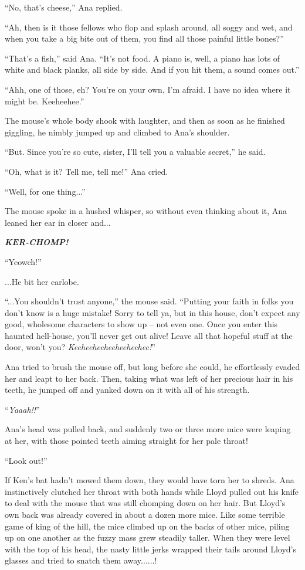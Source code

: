 \documentclass[
]{article}
\begin{document}
``No, that's cheese,'' Ana replied.

``Ah, then is it those fellows who flop and splash around, all soggy and
wet, and when you take a big bite out of them, you find all those
painful little bones?''

``That's a fish,'' said Ana. ``It's not food. A piano is, well, a piano
has lots of white and black planks, all side by side. And if you hit
them, a sound comes out.''

``Ahh, one of those, eh? You're on your own, I'm afraid. I have no idea
where it might be. Keeheehee.''

The mouse's whole body shook with laughter, and then as soon as he
finished giggling, he nimbly jumped up and climbed to Ana's shoulder.

``But. Since you're so cute, sister, I'll tell you a valuable secret,''
he said.

``Oh, what is it? Tell me, tell me!'' Ana cried.

``Well, for one thing...''

The mouse spoke in a hushed whisper, so without even thinking about it,
Ana leaned her ear in closer and...

\emph{\textbf{KER-CHOMP!}}

``Yeowch!''

...He bit her earlobe.

``...You shouldn't trust anyone,'' the mouse said. ``Putting your faith
in folks you don't know is a huge mistake! Sorry to tell ya, but in this
house, don't expect any good, wholesome characters to show up -- not
even one. Once you enter this haunted hell-house, you'll never get out
alive! Leave all that hopeful stuff at the door, won't you?
\emph{Keeheeheeheeheeheehee!}''

Ana tried to brush the mouse off, but long before she could, he
effortlessly evaded her and leapt to her back. Then, taking what was
left of her precious hair in his teeth, he jumped off and yanked down on
it with all of his strength.

``\emph{Yaaah!!}''

Ana's head was pulled back, and suddenly two or three more mice were
leaping at her, with those pointed teeth aiming straight for her pale
throat!

``Look out!''

If Ken's bat hadn't mowed them down, they would have torn her to shreds.
Ana instinctively clutched her throat with both hands while Lloyd pulled
out his knife to deal with the mouse that was still chomping down on her
hair. But Lloyd's own back was already covered in about a dozen more
mice. Like some terrible game of king of the hill, the mice climbed up
on the backs of other mice, piling up on one another as the fuzzy mass
grew steadily taller. When they were level with the top of his head, the
nasty little jerks wrapped their tails around Lloyd's glasses and tried
to snatch them away......!
\end{document}
